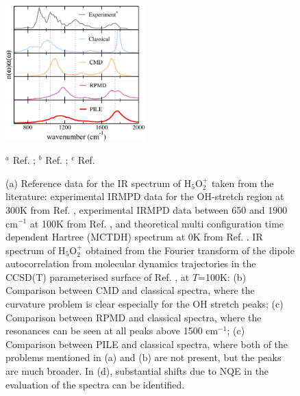 \documentclass[aps,prb,superscriptaddress,amsmath,amssymb,showpacs,twocolumn]{revtex4}
\begin{document}
\begin{figure}[htbp]
\begin{center}
\includegraphics[width=0.48\textwidth]{figures/zundel_lowfreq_100K.pdf}
\end{center}
{\small {}$^a$ Ref. \cite{YehLee1989}; {}$^b$ Ref. \cite{AsmisScience2003}; {}$^c$ Ref. \cite{VendrellMeyer2007}}
\caption{(a) Reference data for the IR spectrum of H$_5$O$_2^+$ taken from the literature: experimental
IRMPD data for the OH-stretch region at 300K from Ref. \cite{YehLee1989}, experimental IRMPD data between 650 and 1900 cm$^{-1}$ 
at 100K from Ref. \cite{AsmisScience2003}, and theoretical multi configuration time dependent Hartree (MCTDH) spectrum at 0K from Ref. \cite{VendrellMeyer2007}.
IR spectrum of H$_5$O$_2^+$ obtained from the Fourier transform of the dipole autocorrelation from molecular 
dynamics trajectories in the CCSD(T) parameterised surface of Ref. \cite{HuangBraamsBowman2005}, at $T$=100K: 
(b) Comparison between CMD and classical spectra, where the curvature problem is clear especially for the OH stretch peaks; 
(c) Comparison between RPMD and classical spectra, where the resonances can be seen at all peaks above 1500 cm$^{-1}$; (c)
Comparison between PILE and classical spectra, where both of the problems mentioned in (a) and (b) are not present, but the peaks
are much broader. In (d), substantial shifts due to NQE in the evaluation of the spectra can be identified.}
\label{fig:zundel-spectra}
\end{figure}
\end{document}
